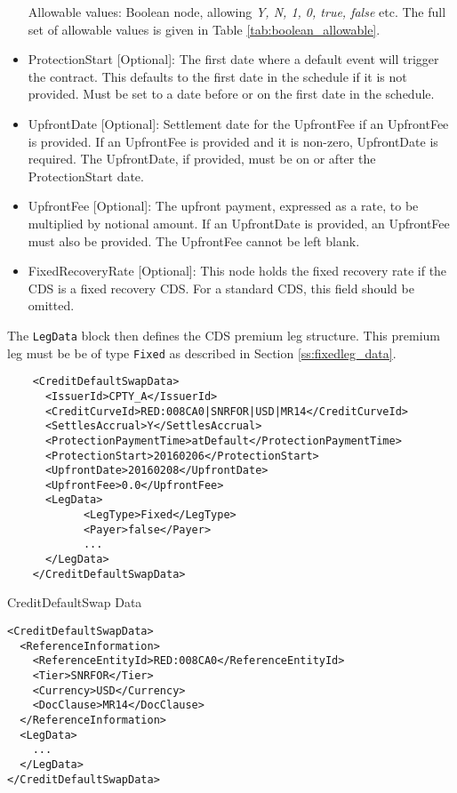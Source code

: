 \begin{itemize}
Allowable values: Boolean node, allowing \emph{Y, N, 1, 0, true, false} etc. The full set of allowable values is given in Table \ref{tab:boolean_allowable}.
  
\item ProtectionStart [Optional]: The first date where a default event will trigger the contract. This defaults to the first date in the schedule if it is not provided. Must be set to a date before or on the first date in the schedule.
\item UpfrontDate [Optional]: Settlement date for the UpfrontFee if an UpfrontFee is provided. If an UpfrontFee is provided and it is non-zero, UpfrontDate is required. The UpfrontDate, if provided, must be on or after the ProtectionStart date.
\item UpfrontFee [Optional]: The upfront payment, expressed as a rate, to be multiplied by notional amount. If an UpfrontDate is provided, an UpfrontFee must also be provided. The UpfrontFee cannot be left blank.
\item FixedRecoveryRate [Optional]: This node holds the fixed recovery rate if the CDS is a fixed recovery CDS. For a standard CDS, this field should be omitted.
\end{itemize}

The \lstinline!LegData! block then defines the CDS premium leg structure. This premium leg must be be of type \lstinline!Fixed! as described in Section \ref{ss:fixedleg_data}.

\begin{listing}[H]
\begin{verbatim}
    <CreditDefaultSwapData>
      <IssuerId>CPTY_A</IssuerId>
      <CreditCurveId>RED:008CA0|SNRFOR|USD|MR14</CreditCurveId>
      <SettlesAccrual>Y</SettlesAccrual>
      <ProtectionPaymentTime>atDefault</ProtectionPaymentTime>
      <ProtectionStart>20160206</ProtectionStart>
      <UpfrontDate>20160208</UpfrontDate>
      <UpfrontFee>0.0</UpfrontFee>
      <LegData>
            <LegType>Fixed</LegType>
            <Payer>false</Payer>
            ...
      </LegData>
    </CreditDefaultSwapData>
\end{verbatim}
\caption{CreditDefaultSwap Data}
\label{lst:cdsdata}
\end{listing}

\begin{listing}[H]
\begin{verbatim}
<CreditDefaultSwapData>
  <ReferenceInformation>
    <ReferenceEntityId>RED:008CA0</ReferenceEntityId>
    <Tier>SNRFOR</Tier>
    <Currency>USD</Currency>
    <DocClause>MR14</DocClause>
  </ReferenceInformation>
  <LegData>
    ...
  </LegData>
</CreditDefaultSwapData>
\end{verbatim}
\caption{\lstinline!CreditDefaultSwapData! with \lstinline!ReferenceInformation!}
\label{lst:cdsdata_with_ref_info}
\end{listing}
